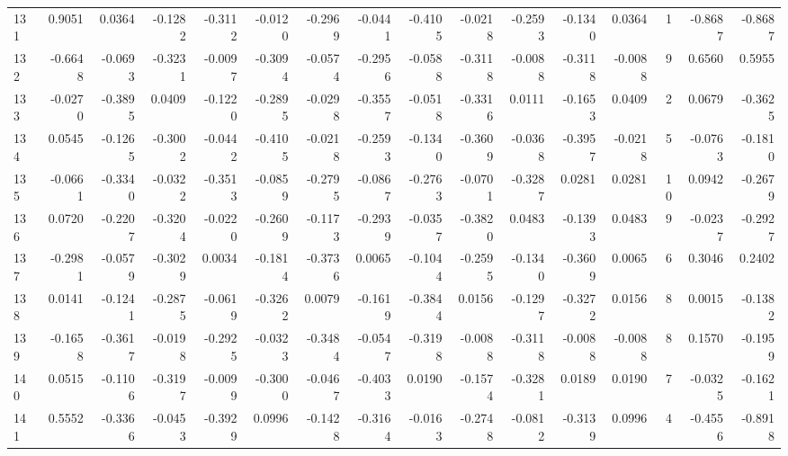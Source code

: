 \begin{tabular}{lrrrrrrrrrrrrrrr}
131 &      0.9051 &  0.0364 & -0.1282 & -0.3112 & -0.0120 & -0.2969 & -0.0441 & -0.4105 & -0.0218 & -0.2593 &  -0.1340 &     0.0364 &      1 &                   -0.8687 &                    -0.8687 \\
132 &     -0.6648 & -0.0693 & -0.3231 & -0.0097 & -0.3094 & -0.0574 & -0.2956 & -0.0588 & -0.3118 & -0.0088 &  -0.3118 &    -0.0088 &      9 &                    0.6560 &                     0.5955 \\
133 &     -0.0270 & -0.3895 &  0.0409 & -0.1220 & -0.2895 & -0.0298 & -0.3557 & -0.0518 & -0.3316 &  0.0111 &  -0.1653 &     0.0409 &      2 &                    0.0679 &                    -0.3625 \\
134 &      0.0545 & -0.1265 & -0.3002 & -0.0442 & -0.4105 & -0.0218 & -0.2593 & -0.1340 & -0.3609 & -0.0368 &  -0.3957 &    -0.0218 &      5 &                   -0.0763 &                    -0.1810 \\
135 &     -0.0661 & -0.3340 & -0.0322 & -0.3513 & -0.0859 & -0.2795 & -0.0867 & -0.2763 & -0.0701 & -0.3287 &   0.0281 &     0.0281 &     10 &                    0.0942 &                    -0.2679 \\
136 &      0.0720 & -0.2207 & -0.3204 & -0.0220 & -0.2609 & -0.1173 & -0.2939 & -0.0357 & -0.3820 &  0.0483 &  -0.1393 &     0.0483 &      9 &                   -0.0237 &                    -0.2927 \\
137 &     -0.2981 & -0.0579 & -0.3029 &  0.0034 & -0.1814 & -0.3736 &  0.0065 & -0.1044 & -0.2595 & -0.1340 &  -0.3609 &     0.0065 &      6 &                    0.3046 &                     0.2402 \\
138 &      0.0141 & -0.1241 & -0.2875 & -0.0619 & -0.3262 &  0.0079 & -0.1619 & -0.3844 &  0.0156 & -0.1297 &  -0.3272 &     0.0156 &      8 &                    0.0015 &                    -0.1382 \\
139 &     -0.1658 & -0.3617 & -0.0198 & -0.2925 & -0.0323 & -0.3484 & -0.0547 & -0.3198 & -0.0088 & -0.3118 &  -0.0088 &    -0.0088 &      8 &                    0.1570 &                    -0.1959 \\
140 &      0.0515 & -0.1106 & -0.3197 & -0.0099 & -0.3000 & -0.0467 & -0.4033 &  0.0190 & -0.1574 & -0.3281 &   0.0189 &     0.0190 &      7 &                   -0.0325 &                    -0.1621 \\
141 &      0.5552 & -0.3366 & -0.0453 & -0.3929 &  0.0996 & -0.1428 & -0.3164 & -0.0163 & -0.2748 & -0.0812 &  -0.3139 &     0.0996 &      4 &                   -0.4556 &                    -0.8918 \\

\end{tabular}
